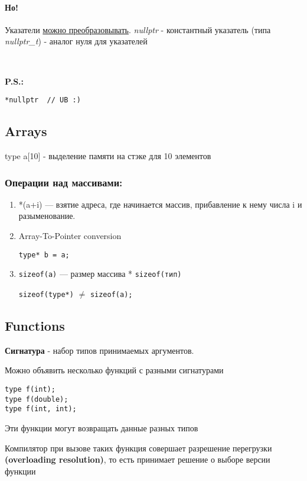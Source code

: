 \documentclass[12pt]{article}
\begin{document}
\paragraph{Но!} Указатели \underline{можно преобразовывать}. \textit{nullptr} - константный указатель (типа \textit{nullptr\_t}) - аналог нуля для указателей

\

\textbf{P.S.:}
\begin{lstlisting}
*nullptr  // UB :)
\end{lstlisting}

\subsection{Arrays}

type a[10] - выделение памяти на стэке для 10 элементов

\subsubsection{Операции над массивами:} 
\begin{enumerate}
	\item *(a+i) --- взятие адреса, где начинается массив, прибавление к нему числа i и разыменование.
	\item Array-To-Pointer conversion 

	\texttt{type* b = a;}
	
	\item \texttt{sizeof(a)} --- размер массива * \texttt{sizeof(тип)}

	\texttt{sizeof(type*)} $\not=$ \texttt{sizeof(a);}
\end{enumerate}

\subsection{Functions}

\textbf{Сигнатура} - набор типов принимаемых аргументов.

Можно объявить несколько функций с разными сигнатурами
\begin{lstlisting}
type f(int);
type f(double);
type f(int, int);
\end{lstlisting}

Эти функции могут возвращать данные разных типов

Компилятор при вызове таких функция совершает разрешение
 перегрузки \textbf{(overloading resolution)}, то есть принимает решение о выборе версии функции
\end{document}
